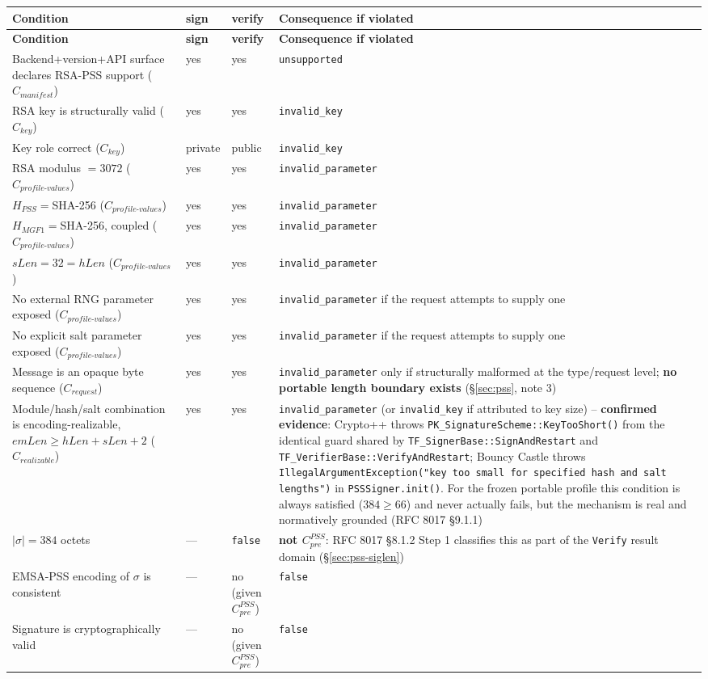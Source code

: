\documentclass[11pt,a4paper]{article}
\begin{document}
\begin{longtable}{p{}p{}p{}p{}}
\toprule
\textbf{Condition} & \textbf{sign} & \textbf{verify} & \textbf{Consequence if violated}\\
\midrule\endfirsthead
\toprule
\textbf{Condition} & \textbf{sign} & \textbf{verify} & \textbf{Consequence if violated}\\
\midrule\endhead
Backend+version+API surface declares RSA-PSS support ($C_{manifest}$) & yes & yes & \texttt{unsupported}\\
RSA key is structurally valid ($C_{key}$) & yes & yes & \texttt{invalid\_key}\\
Key role correct ($C_{key}$) & private & public & \texttt{invalid\_key}\\
RSA modulus $=3072$ ($C_{profile\text{-}values}$) & yes & yes & \texttt{invalid\_parameter}\\
$H_{PSS}=$SHA-256 ($C_{profile\text{-}values}$) & yes & yes & \texttt{invalid\_parameter}\\
$H_{MGF1}=$SHA-256, coupled ($C_{profile\text{-}values}$) & yes & yes & \texttt{invalid\_parameter}\\
$sLen=32=hLen$ ($C_{profile\text{-}values}$) & yes & yes & \texttt{invalid\_parameter}\\
No external RNG parameter exposed ($C_{profile\text{-}values}$) & yes & yes & \texttt{invalid\_parameter} if the request attempts to supply one\\
No explicit salt parameter exposed ($C_{profile\text{-}values}$) & yes & yes & \texttt{invalid\_parameter} if the request attempts to supply one\\
Message is an opaque byte sequence ($C_{request}$) & yes & yes & \texttt{invalid\_parameter} only if structurally malformed at the type/request level; \textbf{no portable length boundary exists} (\S\ref{sec:pss}, note 3)\\
Module/hash/salt combination is encoding-realizable, $emLen \ge hLen+sLen+2$ ($C_{realizable}$) & yes & yes & \texttt{invalid\_parameter} (or \texttt{invalid\_key} if attributed to key size) -- \textbf{confirmed evidence}: Crypto++ throws \texttt{PK\_SignatureScheme::KeyTooShort()} from the identical guard shared by \texttt{TF\_SignerBase::SignAndRestart} and \texttt{TF\_VerifierBase::VerifyAndRestart}; Bouncy Castle throws \texttt{IllegalArgumentException("key too small for specified hash and salt lengths")} in \texttt{PSSSigner.init()}. For the frozen portable profile this condition is always satisfied ($384 \ge 66$) and never actually fails, but the mechanism is real and normatively grounded (RFC 8017 \S9.1.1)\\
$|\sigma| = 384$ octets & --- & \texttt{false} & \textbf{not $C_{pre}^{PSS}$}: RFC 8017 \S8.1.2 Step 1 classifies this as part of the \texttt{Verify} result domain (\S\ref{sec:pss-siglen})\\
EMSA-PSS encoding of $\sigma$ is consistent & --- & no (given $C_{pre}^{PSS}$) & \texttt{false}\\
Signature is cryptographically valid & --- & no (given $C_{pre}^{PSS}$) & \texttt{false}\\
\bottomrule
\end{longtable}
\end{document}

